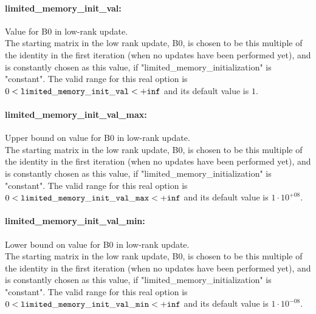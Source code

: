 \paragraph{limited\_memory\_init\_val:}\label{sec:limited_memory_init_val} Value for B0 in low-rank update. $\;$ \\
 The starting matrix in the low rank update, B0,
is chosen to be this multiple of the identity in
the first iteration (when no updates have been
performed yet), and is constantly chosen as this
value, if "limited\_memory\_initialization" is
"constant". The valid range for this real option is 
$0 <  {\tt limited\_memory\_init\_val } <  {\tt +inf}$
and its default value is $1$.


\paragraph{limited\_memory\_init\_val\_max:}\label{sec:limited_memory_init_val_max} Upper bound on value for B0 in low-rank update. $\;$ \\
 The starting matrix in the low rank update, B0,
is chosen to be this multiple of the identity in
the first iteration (when no updates have been
performed yet), and is constantly chosen as this
value, if "limited\_memory\_initialization" is
"constant". The valid range for this real option is 
$0 <  {\tt limited\_memory\_init\_val\_max } <  {\tt +inf}$
and its default value is $1 \cdot 10^{+08}$.


\paragraph{limited\_memory\_init\_val\_min:}\label{sec:limited_memory_init_val_min} Lower bound on value for B0 in low-rank update. $\;$ \\
 The starting matrix in the low rank update, B0,
is chosen to be this multiple of the identity in
the first iteration (when no updates have been
performed yet), and is constantly chosen as this
value, if "limited\_memory\_initialization" is
"constant". The valid range for this real option is 
$0 <  {\tt limited\_memory\_init\_val\_min } <  {\tt +inf}$
and its default value is $1 \cdot 10^{-08}$.


